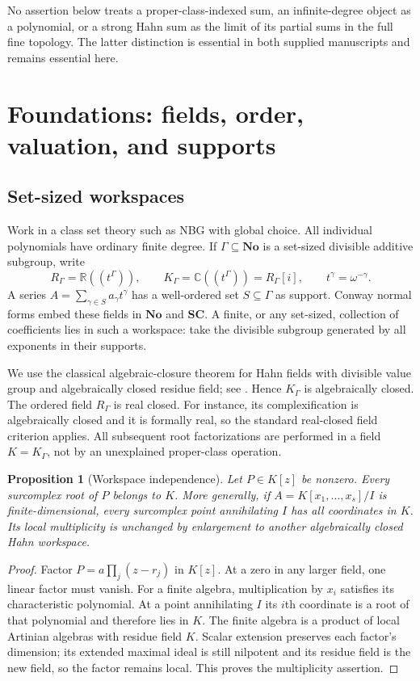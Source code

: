 \documentclass[11pt,letterpaper,oneside]{article}
\numberwithin{equation}{section}
\newtheorem{proposition}[theorem]{Proposition}
\theoremstyle{definition}
\theoremstyle{remark}\newtheorem{remark}[theorem]{Remark}
\newcommand{\No}{\mathbf{No}}\newcommand{\SC}{\mathbf{SC}}
\newcommand{\C}{\mathbb C}\newcommand{\R}{\mathbb R}\newcommand{\Q}{\mathbb Q}
\begin{document}
No assertion below treats a proper-class-indexed sum, an infinite-degree
object as a polynomial, or a strong Hahn sum as the limit of its partial
sums in the full fine topology. The latter distinction is essential in both
supplied manuscripts and remains essential here.

\section{Foundations: fields, order, valuation, and supports}\label{sec:foundations}
\subsection{Set-sized workspaces}
Work in a class set theory such as NBG with global choice. All individual
polynomials have ordinary finite degree. If $\Gamma\subseteq\No$ is a
set-sized divisible additive subgroup, write
\[
 R_\Gamma=\R((t^\Gamma)),\qquad
 K_\Gamma=\C((t^\Gamma))=R_\Gamma[i],\qquad
 t^\gamma=\omega^{-\gamma}.
\]
A series $A=\sum_{\gamma\in S}a_\gamma t^\gamma$ has a well-ordered
set $S\subseteq\Gamma$ as support. Conway normal forms embed these fields
in $\No$ and $\SC$. A finite, or any set-sized, collection of coefficients
lies in such a workspace: take the divisible subgroup generated by all
exponents in their supports.

We use the classical algebraic-closure theorem for Hahn fields with divisible
value group and algebraically closed residue field; see
\cite[Corollary 4]{Poonen}. Hence $K_\Gamma$ is algebraically closed.
The ordered field $R_\Gamma$ is real closed. For instance, its complexification
is algebraically closed and it is formally real, so the standard real-closed
field criterion applies. All subsequent root factorizations are performed
in a field $K=K_\Gamma$, not by an unexplained proper-class operation.

\begin{proposition}[Workspace independence]\label{prop:workspace}
Let $P\in K[z]$ be nonzero. Every surcomplex root of $P$ belongs to $K$.
More generally, if $A=K[x_1,\ldots,x_s]/I$ is finite-dimensional, every
surcomplex point annihilating $I$ has all coordinates in $K$. Its local
multiplicity is unchanged by enlargement to another algebraically closed
Hahn workspace.
\end{proposition}
\begin{proof}
Factor $P=a\prod_j(z-r_j)$ in $K[z]$. At a zero in any larger field, one
linear factor must vanish. For a finite algebra, multiplication by $x_i$
satisfies its characteristic polynomial. At a point annihilating $I$ its
$i$th coordinate is a root of that polynomial and therefore lies in $K$.
The finite algebra is a product of local Artinian algebras with residue
field $K$. Scalar extension preserves each factor's dimension; its extended
maximal ideal is still nilpotent and its residue field is the new field,
so the factor remains local. This proves the multiplicity assertion.
\end{proof}
\end{document}
